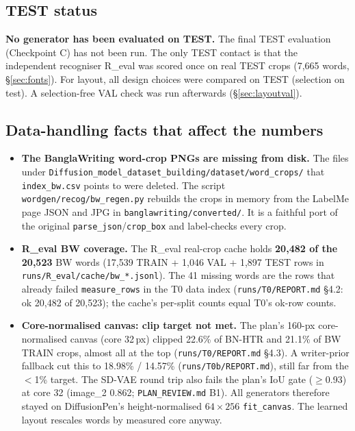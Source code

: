 \documentclass[10.5pt,a4paper]{article}
\newcommand{\fp}[1]{\nolinkurl{#1}}
\begin{document}
\subsection{TEST status}
\textbf{No generator has been evaluated on TEST.} The final TEST evaluation (Checkpoint C) has not been run. The only TEST
contact is that the independent recogniser R\_eval was scored once on real TEST crops (7,665 words, \S\ref{sec:fonts}). For
layout, all design choices were compared on TEST (selection on test). A selection-free VAL check was run afterwards
(\S\ref{sec:layoutval}).

\subsection{Data-handling facts that affect the numbers}
\begin{itemize}
\item \textbf{The BanglaWriting word-crop PNGs are missing from disk.} The files under
  \fp{Diffusion_model_dataset_building/dataset/word_crops/} that \fp{index_bw.csv} points to were deleted. The script
  \fp{wordgen/recog/bw_regen.py} rebuilds the crops in memory from the LabelMe page JSON and JPG in
  \fp{banglawriting/converted/}. It is a faithful port of the original \texttt{parse\_json}/\texttt{crop\_box} and
  label-checks every crop.
\item \textbf{R\_eval BW coverage.} The R\_eval real-crop cache holds \textbf{20,482 of the 20,523} BW words (17,539 TRAIN +
  1,046 VAL + 1,897 TEST rows in \fp{runs/R_eval/cache/bw_*.jsonl}). The 41 missing words are the rows that already failed
  \texttt{measure\_rows} in the T0 data index (\fp{runs/T0/REPORT.md} \S4.2: ok 20,482 of 20,523); the cache's per-split
  counts equal T0's ok-row counts.
\item \textbf{Core-normalised canvas: clip target not met.} The plan's 160-px core-normalised canvas (core 32\,px) clipped
  22.6\% of BN-HTR and 21.1\% of BW TRAIN crops, almost all at the top (\fp{runs/T0/REPORT.md} \S4.3). A writer-prior fallback
  cut this to 18.98\% / 14.57\% (\fp{runs/T0b/REPORT.md}), still far from the $<$1\% target. The SD-VAE round trip also fails
  the plan's IoU gate ($\ge$0.93) at core 32 (image\_2 0.862; \fp{PLAN_REVIEW.md} B1). All generators therefore stayed on
  DiffusionPen's height-normalised $64\times256$ \texttt{fit\_canvas}. The learned layout rescales words by measured core
  anyway.
\end{itemize}

\end{document}
